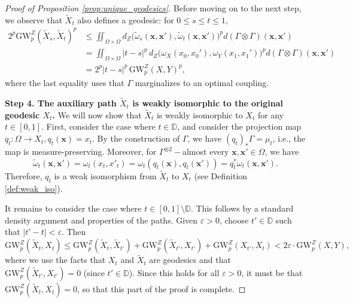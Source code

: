\documentclass{article}
\theoremstyle{definition}
\newcommand{\dgwz}{\mathrm{GW}_p^Z}
\begin{document}
\begin{proof}[Proof of Proposition \ref{prop:unique_geodesics}]
%
%

%
%
%
%
%
%
%
%
%
%
%
%
%
%
%
%

%
%
%
%
%
%
%
%
%
%

%
%
%
%
%
%
%
%
%
%
%
%
%
%
%
%
%
%
%
%
%
%
%

Before moving on to the next step, we observe that $\widetilde{X}_t$ also defines a geodesic: for $0\leq s \leq t \leq 1$, 
\begin{align*}
2^p\dgwz(\widetilde{X}_s,\widetilde{X}_t)^p
&\leq \iint_{\Omega \times \Omega} d_Z\bigl(\tilde{\omega}_s(\mathbf{x},\mathbf{x}'),\tilde{\omega}_t(\mathbf{x},\mathbf{x}')\bigr)^p d(\Gamma \otimes \Gamma)(\mathbf{x},\mathbf{x}') \\
&= \iint_{\Omega \times \Omega} |t-s|^p\, d_Z\bigl(\omega_X(x_0,x_0'),\omega_Y(x_1,x_1')\bigr)^p d(\Gamma \otimes \Gamma)(\mathbf{x},\mathbf{x}') \\
&= 2^p|t-s|^p\,\dgwz(X,Y)^{p},
\end{align*}
where the last equality uses that $\Gamma$ marginalizes to an optimal coupling.

     \smallskip
    \noindent \textbf{Step 4. The auxiliary path  $\widetilde{X}_t$ is weakly isomorphic to the original geodesic $X_t$.}
    We will now show that $\widetilde{X}_t$ is weakly isomorphic to $X_t$ for any $t\in [0,1]$. First, consider the case where $t\in \mathbb{D}$, and consider the projection map $q_t:\Omega \to X_t, q_t(\mathbf{x})=x_t$. By the construction of $\Gamma$, we have $(q_t)_* \Gamma = \mu_t$, i.e., the map is measure-preserving. Moreover, for $\Gamma^{\otimes 2}-$almost every $\mathbf{x},\mathbf{x}'\in \Omega$, we have
    \begin{equation}
        \tilde{\omega}_t(\mathbf{x},\mathbf{x}') = \omega_t(x_t,x'_t) =  \omega_t(q_t(\mathbf{x}),q_t(\mathbf{x}'))=q_t^*\omega_t(\mathbf{x},\mathbf{x}').
    \end{equation}
    Therefore, $q_t$ is a weak isomorphism from $\widetilde{X}_t$ to $X_t$ (see Definition \ref{def:weak_iso}).

    It remains to consider the case where $t \in [0,1] \setminus \mathbb{D}$. This follows by a standard density argument and properties of the paths. Given $\varepsilon > 0$, choose $t' \in \mathbb{D}$ such that $|t' - t| < \varepsilon$. Then 
    \[
    \dgwz(\widetilde{X}_t,X_t) \leq \dgwz(\widetilde{X}_t,\widetilde{X}_{t'}) + \dgwz(\widetilde{X}_{t'},X_{t'}) + \dgwz(X_{t'},X_t) < 2\varepsilon \cdot \dgwz(X,Y),
    \]
    where we use the facts that $X_t$ and $\widetilde{X}_t$ are geodesics and that $\dgwz(\widetilde{X}_{t'},X_{t'})=0$ (since $t' \in \mathbb{D}$). Since this holds for all $\varepsilon > 0$, it must be that $\dgwz(\widetilde{X}_t,X_t)=0$, so that this part of the proof is complete.


\end{proof}
\end{document}
